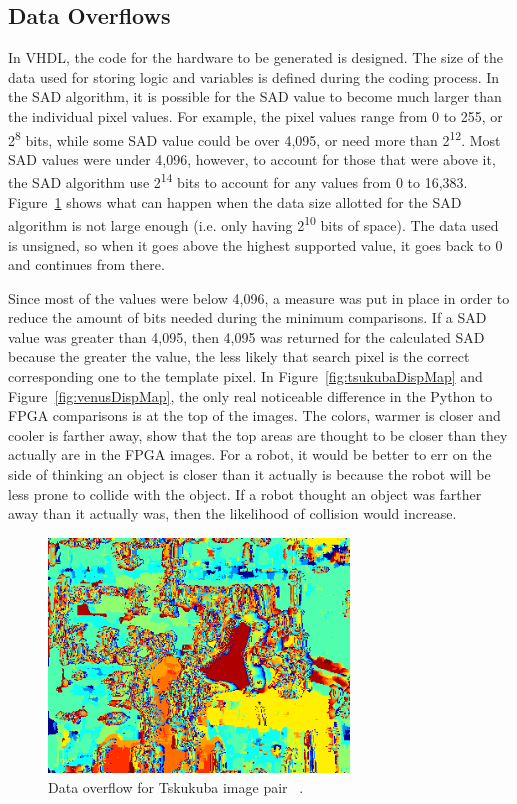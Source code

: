 \subsection{Data Overflows}
\label{sec:overflow}

In VHDL, the code for the hardware to be generated is designed. The size of the data used for storing logic and variables is defined during the coding process. In the SAD algorithm, it is possible for the SAD value to become much larger than the individual pixel values. For example, the pixel values range from 0 to 255, or 2\textsuperscript{8} bits, while some SAD value could be over 4,095, or need more than 2\textsuperscript{12}. Most SAD values were under 4,096, however, to account for those that were above it, the SAD algorithm use 2\textsuperscript{14} bits to account for any values from 0 to 16,383. Figure~\ref{fig:overflow} shows what can happen when the data size allotted for the SAD algorithm is not large enough (i.e. only having 2\textsuperscript{10} bits of space). The data used is unsigned, so when it goes above the highest supported value, it goes back to 0 and continues from there. 

Since most of the values were below 4,096, a measure was put in place in order to reduce the amount of bits needed during the minimum comparisons. If a SAD value was greater than 4,095, then 4,095 was returned for the calculated SAD because the greater the value, the less likely that search pixel is the correct corresponding one to the template pixel. In Figure~\ref{fig:tsukubaDispMap} and Figure~\ref{fig:venusDispMap}, the only real noticeable difference in the Python to FPGA comparisons is at the top of the images. The colors, warmer is closer and cooler is farther away, show that the top areas are thought to be closer than they actually are in the FPGA images. For a robot, it would be better to err on the side of thinking an object is closer than it actually is because the robot will be less prone to collide with the object. If a robot thought an object was farther away than it actually was, then the likelihood of collision would increase.

\begin{figure}
	\begin{center}
		\includegraphics[width=80mm]{figures/tsukuba_disp9x9_2_sad_overflow.png}
		\captionfonts
		\caption{Data overflow for Tskukuba image pair ~\cite{middlebury}.}
		\label{fig:overflow}
	\end{center}
\end{figure}

